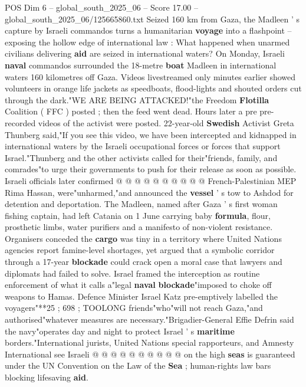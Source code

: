 \begin{textsample}{POS Dim 6 – global\_south\_2025\_06 – Score 17.00 – global\_south\_2025\_06/125665860.txt}  \label{ex:f6_pos_004}
Seized 160 km from Gaza, the Madleen ' s capture by Israeli commandos turns a humanitarian \textbf{voyage} into a flashpoint -- exposing the hollow edge of international law : What happened when unarmed civilians delivering \textbf{aid} are seized in international waters?
On Monday, Israeli \textbf{naval} commandos surrounded the 18-metre \textbf{boat} Madleen in international waters 160 kilometres off Gaza.
Videos livestreamed only minutes earlier showed volunteers in orange life jackets as speedboats, flood-lights and shouted orders cut through the dark."WE ARE BEING ATTACKED!"the Freedom \textbf{Flotilla} Coalition ( FFC ) posted ; then the feed went dead.
Hours later a pre pre-recorded videos of the activist were posted. 22-year-old \textbf{Swedish} Activist Greta Thunberg said,"If you see this video, we have been intercepted and kidnapped in international waters by the Israeli occupational forces or forces that support Israel."Thunberg and the other activists called for their"friends, family, and comrades"to urge their governments to push for their release as soon as possible.
Israeli officials later confirmed @ @ @ @ @ @ @ @ @ @ French-Palestinian MEP Rima Hassan, were"unharmed,"and announced the \textbf{vessel} ' s tow to Ashdod for detention and deportation.
The Madleen, named after Gaza ' s first woman fishing captain, had left Catania on 1 June carrying baby \textbf{formula}, flour, prosthetic limbs, water purifiers and a manifesto of non-violent resistance.
Organisers conceded the \textbf{cargo} was tiny in a territory where United Nations agencies report famine-level shortages, yet argued that a symbolic corridor through a 17-year \textbf{blockade} could crack open a moral case that lawyers and diplomats had failed to solve.
Israel framed the interception as routine enforcement of what it calls a"legal \textbf{naval} \textbf{blockade}"imposed to choke off weapons to Hamas.
Defence Minister Israel Katz pre-emptively labelled the voyagers"**25 ; 698 ; TOOLONG friends"who"will not reach Gaza,"and authorised"whatever measures are necessary."Brigadier-General Effie Defrin said the navy"operates day and night to protect Israel ' s \textbf{maritime} borders."International jurists, United Nations special rapporteurs, and Amnesty International see Israeli @ @ @ @ @ @ @ @ @ @ on the high \textbf{seas} is guaranteed under the UN Convention on the Law of the \textbf{Sea} ; human-rights law bars blocking lifesaving \textbf{aid}.

\end{textsample}
